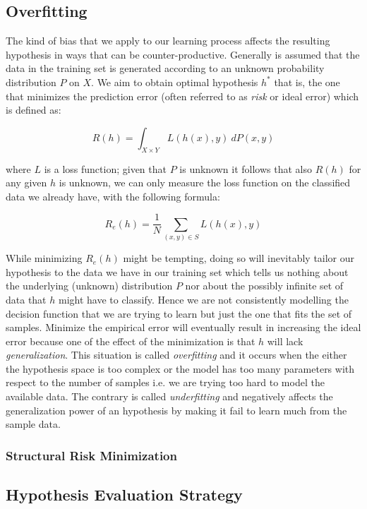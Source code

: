 \subsection{Overfitting}
The kind of bias that we apply to our learning process affects the resulting
hypothesis in ways that can be counter-productive.
Generally is assumed that the data in the training set is generated according
to an unknown probability distribution $P$ on $X$.
We aim to obtain optimal hypothesis $h^*$ that is, the one that minimizes the
prediction error (often referred to as \emph{risk} or ideal error) which is
defined as:

$$R(h)=\int_{X\times Y} L(h(x),y)~dP(x,y)$$

where $L$ is a loss function; given that $P$ is unknown it follows that also
$R(h)$ for any given $h$ is unknown, we can only measure the loss function
on the classified data we already have, with the following formula:

$$R_e(h)=\frac{1}{N} \sum_{(x,y) \in S} L(h(x),y)$$

While minimizing $R_e(h)$ might be tempting, doing so will inevitably tailor our
hypothesis to the data we have in our training set which tells us nothing about
the underlying (unknown) distribution $P$ nor about the possibly infinite set of
data that $h$ might have to classify.
Hence we are not consistently modelling the decision function that we are trying
to learn but just the one that fits the set of samples.
Minimize the empirical error will eventually result in increasing the ideal
error because one of the effect of the minimization is that $h$ will lack
\emph{generalization}.
This situation is called \emph{overfitting} and it occurs when the either the
hypothesis space is too complex or the model has too many parameters with
respect to the number of samples i.e. we are trying too hard to model the
available data.
The contrary is called \emph{underfitting} and negatively affects the
generalization power of an hypothesis by making it fail to learn much from the
sample data.

\subsubsection{Structural Risk Minimization}

\subsection{Hypothesis Evaluation Strategy}
\label{subsec:evaluation}

